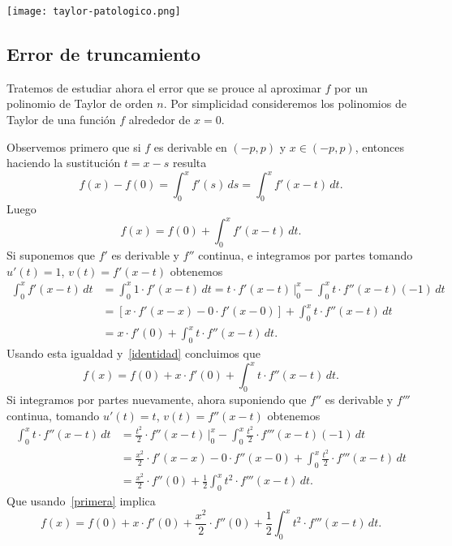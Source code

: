 \centerline{\texttt{[image: taylor-patologico.png]}}

\subsection{Error de truncamiento}

Tratemos de estudiar ahora el error que se prouce al aproximar $f$ por un polinomio de Taylor de orden $n$. Por simplicidad consideremos los polinomios de Taylor de una función $f$ alrededor de $x=0$.

Observemos primero que si $f$ es derivable en $(-p,p)$ y $x \in (-p,p)$, entonces haciendo la sustitución $t = x - s$ resulta
\[
 f(x) - f(0) = \int_0^x f'(s)\, ds = \int_0^x f'(x-t) \, dt.
\]
Luego
\begin{equation}\label{identidad}
 f(x) = f(0) + \int_0^x f'(x-t) \, dt.
\end{equation}
Si suponemos que $f'$ es derivable y $f''$ continua, e integramos por partes tomando $u'(t) = 1$, $v(t) = f'(x-t)$ obtenemos
\begin{align*}
 \int_0^x f'(x-t) \, dt &= \int_0^x 1 \cdot f'(x-t)\, dt
                         = t \cdot f'(x-t) \, \Big|_0^x - \int_0^x t \cdot f''(x-t) (-1) \, dt \\
&= \left[ x \cdot f'(x-x) - 0 \cdot f'(x-0) \right] + \int_0^x t \cdot f''(x-t) \, dt \\
& = x \cdot f'(0) + \int_0^x t \cdot f''(x-t) \, dt.
\end{align*}
Usando esta igualdad y~\eqref{identidad} concluimos que
\begin{equation}\label{primera}
 f(x) = f(0) + x \cdot f'(0) + \int_0^x t \cdot f''(x-t) \, dt.
\end{equation}
Si integramos por partes nuevamente, ahora suponiendo que $f''$ es derivable y $f'''$ continua, tomando $u'(t) = t$, $v(t) = f''(x-t)$ obtenemos
\begin{align*}
 \int_0^x t \cdot f''(x-t) \, dt &= \frac{t^2}{2} \cdot f''(x-t) \, \Big|_0^x - \int_0^x \frac{t^2}2 \cdot f'''(x-t) (-1) \, dt \\
&= \frac{x^2}2 \cdot f'(x-x) - 0 \cdot f''(x-0) + \int_0^x \frac{t^2}2 \cdot f'''(x-t) \, dt \\
& = \frac{x^2}2 \cdot f''(0) + \frac12 \int_0^x t^2 \cdot f'''(x-t) \, dt.
\end{align*}
Que usando~\eqref{primera} implica
\begin{equation}\label{segunda}
 f(x) = f(0) + x \cdot f'(0) + \frac{x^2}2 \cdot f''(0) +\frac12 \int_0^x t^2 \cdot f'''(x-t) \, dt.
\end{equation}

